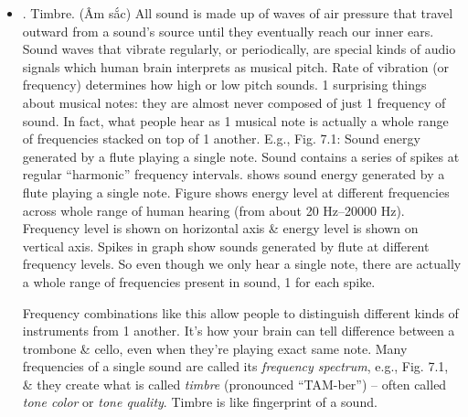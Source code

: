 \documentclass{article}
\begin{document}
\begin{itemize}
\begin{itemize}
		\item {. Timbre.} (Âm sắc) All sound is made up of waves of air pressure that travel outward from a sound's source until they eventually reach our inner ears. Sound waves that vibrate regularly, or periodically, are special kinds of audio signals which human brain interprets as musical pitch. Rate of vibration (or frequency) determines how high or low pitch sounds. 1 surprising things about musical notes: they are almost never composed of just 1 frequency of sound. In fact, what people hear as 1 musical note is actually a whole range of frequencies stacked on top of 1 another. E.g., {\sf Fig. 7.1: Sound energy generated by a flute playing a single note. Sound contains a series of spikes at regular ``harmonic'' frequency intervals.} shows  sound energy generated by a flute playing a single note. Figure shows energy level at different frequencies across whole range of human hearing (from about 20 Hz--20000 Hz). Frequency level is shown on horizontal axis \& energy level is shown on vertical axis. Spikes in graph show sounds generated by flute at different frequency levels. So even though we only hear a single note, there are actually a whole range of frequencies present in sound, 1 for each spike.
		
		Frequency combinations like this allow people to distinguish different kinds of instruments from 1 another. It's how your brain can tell difference between a trombone \& cello, even when they're playing exact same note. Many frequencies of a single sound are called its {\it frequency spectrum}, e.g., {\sf Fig. 7.1}, \& they create what is called {\it timbre} (pronounced ``TAM-ber'') -- often called {\it tone color} or {\it tone quality}. Timbre is like fingerprint of a sound.
		

\end{itemize}
\end{itemize}
\end{document}
